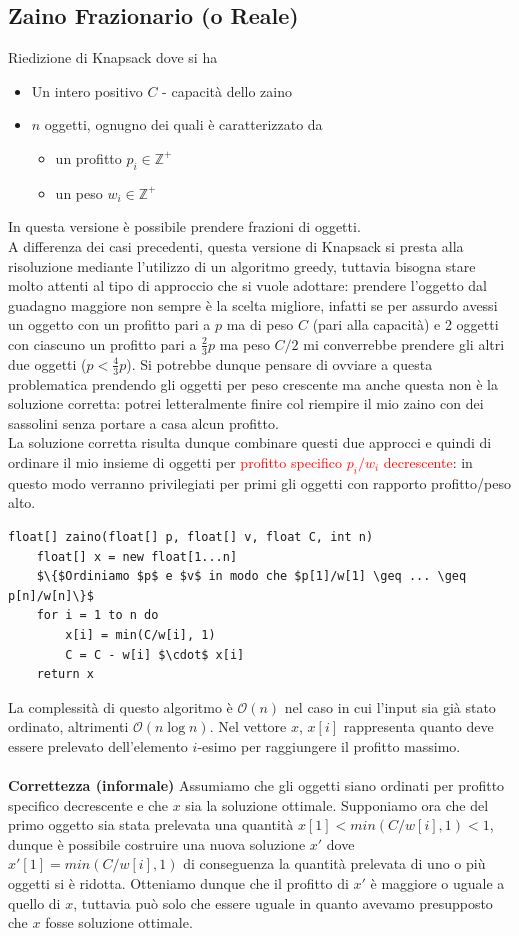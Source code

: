 \documentclass[../cheatSheetAlgoritmi.tex]{subfiles}
\begin{document}
\subsection{Zaino Frazionario (o Reale)}
Riedizione di Knapsack dove si ha
\begin{itemize}
	\item Un intero positivo $C$ - capacità dello zaino
	\item $n$ oggetti, ognugno dei quali è caratterizzato da
	\begin{itemize}
		\item un profitto $p_{i} \in \mathbb{Z}^{+}$
		\item un peso $w_{i} \in \mathbb{Z}^{+}$
	\end{itemize}
\end{itemize}
In questa versione è possibile prendere frazioni di oggetti.\\
A differenza dei casi precedenti, questa versione di Knapsack si presta alla risoluzione mediante l'utilizzo di un algoritmo greedy, tuttavia bisogna stare molto attenti al tipo di approccio che si vuole adottare: prendere l'oggetto dal guadagno maggiore non sempre è la scelta migliore, infatti se per assurdo avessi un oggetto con un profitto pari a $p$ ma di peso $C$ (pari alla capacità) e 2 oggetti con ciascuno un profitto pari a $\frac{2}{3} p$ ma peso $C/2$ mi converrebbe prendere gli altri due oggetti ($p < \frac{4}{3}p$). Si potrebbe dunque pensare di ovviare a questa problematica prendendo gli oggetti per peso crescente ma anche questa non è la soluzione corretta: potrei letteralmente finire col riempire il mio zaino con dei sassolini senza portare a casa alcun profitto.\\
La soluzione corretta risulta dunque combinare questi due approcci e quindi di ordinare il mio insieme di oggetti per \textcolor{red}{profitto specifico $p_{i}/w_{i}$ decrescente}: in questo modo verranno privilegiati per primi gli oggetti con rapporto profitto/peso alto.
\begin{lstlisting}[caption=Zaino Frazionario]
float[] zaino(float[] p, float[] v, float C, int n)
	float[] x = new float[1...n]
	$\{$Ordiniamo $p$ e $v$ in modo che $p[1]/w[1] \geq ... \geq p[n]/w[n]\}$
	for i = 1 to n do
		x[i] = min(C/w[i], 1)
		C = C - w[i] $\cdot$ x[i]
	return x
\end{lstlisting}
La complessità di questo algoritmo è $\mathcal{O}(n)$ nel caso in cui l'input sia già stato ordinato, altrimenti $\mathcal{O}(n \log{n})$. Nel vettore $x$, $x[i]$ rappresenta quanto deve essere prelevato dell'elemento $i$-esimo per raggiungere il profitto massimo.\\\\
\textbf{Correttezza (informale)}
Assumiamo che gli oggetti siano ordinati per profitto specifico decrescente e che $x$ sia la soluzione ottimale. Supponiamo ora che del primo oggetto sia stata prelevata una quantità $x[1] < min(C/w[i], 1) < 1$, dunque è possibile costruire una nuova soluzione $x'$ dove $x'[1] = min(C/w[i], 1)$ di conseguenza la quantità prelevata di uno o più oggetti si è ridotta. Otteniamo dunque che il profitto di $x'$ è maggiore o uguale a quello di $x$, tuttavia può solo che essere uguale in quanto avevamo presupposto che $x$ fosse soluzione ottimale.
\end{document}
